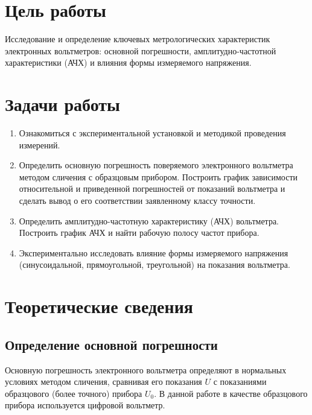 \section*{Цель работы}
Исследование и определение ключевых метрологических характеристик электронных вольтметров: основной погрешности, амплитудно-частотной характеристики (АЧХ) и влияния формы измеряемого напряжения.

\section*{Задачи работы}
\begin{enumerate}
    \item Ознакомиться с экспериментальной установкой и методикой проведения измерений.
    \item Определить основную погрешность поверяемого электронного вольтметра методом сличения с образцовым прибором. Построить график зависимости относительной и приведенной погрешностей от показаний вольтметра и сделать вывод о его соответствии заявленному классу точности.
    \item Определить амплитудно-частотную характеристику (АЧХ) вольтметра. Построить график АЧХ и найти рабочую полосу частот прибора.
    \item Экспериментально исследовать влияние формы измеряемого напряжения (синусоидальной, прямоугольной, треугольной) на показания вольтметра.
\end{enumerate}

\section*{Теоретические сведения}

\subsection*{Определение основной погрешности}
Основную погрешность электронного вольтметра определяют в нормальных условиях методом сличения, сравнивая его показания $U$ с показаниями образцового (более точного) прибора $U_0$. В данной работе в качестве образцового прибора используется цифровой вольтметр.

